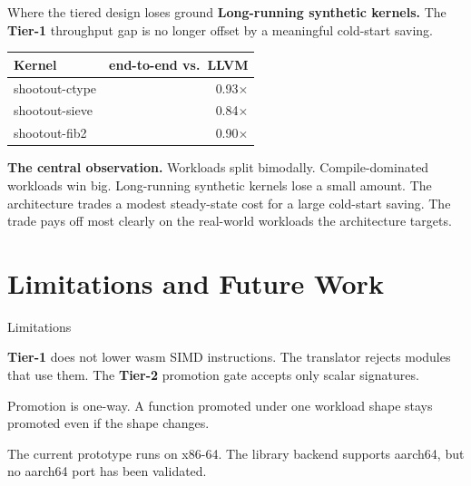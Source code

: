 \documentclass[aspectratio=169,11pt]{beamer}
\newcommand{\tone}{\textbf{\textcolor{tier1}{Tier-1}}}
\newcommand{\ttwo}{\textbf{\textcolor{tier2}{Tier-2}}}
\newcommand{\code}[1]{{\ttfamily\small #1}}
\begin{document}
\begin{frame}{Where the tiered design loses ground}
  \textbf{Long-running synthetic kernels.}
  The \tone{} throughput gap is no longer offset by a meaningful cold-start saving.

  \vspace{0.5em}
  \centering
  \small
  \begin{tabular}{lr}
    \toprule
    Kernel & end-to-end vs.\ LLVM \\
    \midrule
    \code{shootout-ctype} & 0.93$\times$ \\
    \code{shootout-sieve} & 0.84$\times$ \\
    \code{shootout-fib2}  & 0.90$\times$ \\
    \bottomrule
  \end{tabular}

  \vspace{0.7em}
  \textbf{The central observation.}
  Workloads split bimodally.
  Compile-dominated workloads win big.
  Long-running synthetic kernels lose a small amount.
  The architecture trades a modest steady-state cost for a large cold-start saving.
  The trade pays off most clearly on the real-world workloads the architecture targets.
\end{frame}

\section{Limitations and Future Work}

\begin{frame}{Limitations}
  \begin{description}\setlength{\itemsep}{0.5em}
    \item[No SIMD lowering.]
      \tone{} does not lower wasm SIMD instructions.
      The translator rejects modules that use them.
      The \ttwo{} promotion gate accepts only scalar signatures.
    \item[No de-tiering.]
      Promotion is one-way.
      A function promoted under one workload shape stays promoted even if the shape changes.
    \item[x86-64 only.]
      The current prototype runs on x86-64.
      The library backend supports aarch64, but no aarch64 port has been validated.
  \end{description}
\end{frame}
\end{document}

